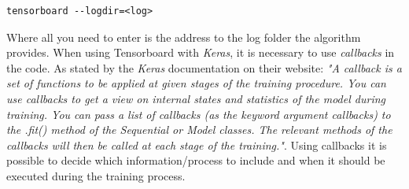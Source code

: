 \documentclass[USenglish]{ifimaster}  %
\begin{document}
\begin{verbatim}
tensorboard --logdir=<log> 
\end{verbatim}
Where all you need to enter is the address to the log folder the algorithm provides. 
\newline
When using Tensorboard with \textit{Keras}, it is necessary to use \textit{callbacks} in the code. As stated by the \textit{Keras} documentation on their website:
\newline
\newline
\textit{"A callback is a set of functions to be applied at given stages of the training procedure. You can use callbacks to get a view on internal states and statistics of the model during training. You can pass a list of callbacks (as the keyword argument callbacks) to the .fit() method of the Sequential or Model classes. The relevant methods of the callbacks will then be called at each stage of the training."}\cite{website:Keras_doc}. 
\newline
\newline
Using callbacks it is possible to decide which information/process to include and when it should be executed during the training process.
\end{document}
